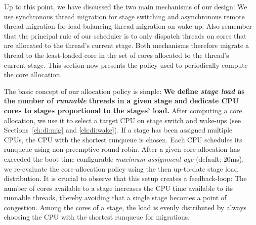 \documentclass[12pt,a4paper]{book}
\begin{document}
%
Up to this point, we have discussed the two main mechanisms of our design:
We use synchronous thread migration for stage switching and asynchronous remote thread migration for load-balancing thread migration on wake-up.
Also remember that the principal rule of our scheduler is to only dispatch threads on cores that are allocated to the thread's current stage.
Both mechanisms therefore migrate a thread to the least-loaded core in the set of cores allocated to the thread's current stage.
This section now presents the policy used to periodically compute the core allocation.


The basic concept of our allocation policy is simple:
\textbf{We define \emph{stage load} as the number of \emph{runnable} threads in a given stage and dedicate CPU cores to stages proportional to the stages' load.}
After computing a core allocation, we use it to select a target CPU on stage switch and wake-ups (see Sections~\ref{ch:di:mig} and \ref{ch:di:wake}).
If a stage has been assigned multiple CPUs, the CPU with the shortest runqueue is chosen.
Each CPU schedules its runqueue using non-preemptive round robin.
After a given core allocation has exceeded the boot-time-configurable \emph{maximum assignment age} (default: 20ms), we re-evaluate the core-allocation policy using the then up-to-date stage load distribution.
It is crucial to observe that this setup creates a feedback-loop:
The number of cores available to a stage increases the CPU time available to its runnable threads, thereby avoiding that a single stage becomes a point of congestion.
Among the cores of a stage, the load is evenly distributed by always choosing the CPU with the shortest runqueue for migrations.
\end{document}
